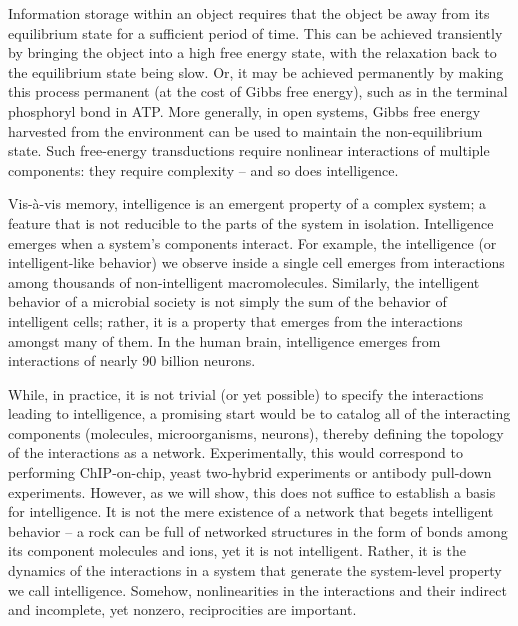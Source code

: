 Information storage within an object requires that the object be away from its equilibrium state for a sufficient period of time. This can be achieved transiently by bringing the object into a high free energy state, with the relaxation back to the equilibrium state being slow. Or, it may be achieved permanently by making this process permanent (at the cost of Gibbs free energy), such as in the terminal phosphoryl bond in ATP. More generally, in open systems, Gibbs free energy harvested from the environment can be used to maintain the non-equilibrium state. Such free-energy transductions require nonlinear interactions of multiple components: they require complexity \cite{westerhoff_thermodynamics_1987} – and so does intelligence.

Vis-à-vis memory, intelligence is an emergent property of a complex system; a feature that is not reducible to the parts of the system in isolation. Intelligence emerges when a system’s components interact. For example, the intelligence (or intelligent-like behavior) we observe inside a single cell emerges from interactions among thousands of non-intelligent macromolecules. Similarly, the intelligent behavior of a microbial society is not simply the sum of the behavior of intelligent cells; rather, it is a property that emerges from the interactions amongst many of them. In the human brain, intelligence emerges from interactions of nearly 90 billion neurons.

While, in practice, it is not trivial (or yet possible) to specify the interactions leading to intelligence, a promising start would be to catalog all of the interacting components (molecules, microorganisms, neurons), thereby defining the topology of the interactions as a network. Experimentally, this would correspond to performing ChIP-on-chip, yeast two-hybrid experiments or antibody pull-down experiments. However, as we will show, this does not suffice to establish a basis for intelligence. It is not the mere existence of a network that begets intelligent behavior – a rock can be full of networked structures in the form of bonds among its component molecules and ions, yet it is not intelligent. Rather, it is the dynamics of the interactions in a system that generate the system-level property we call intelligence. Somehow, nonlinearities in the interactions and their indirect and incomplete, yet nonzero, reciprocities are important.


